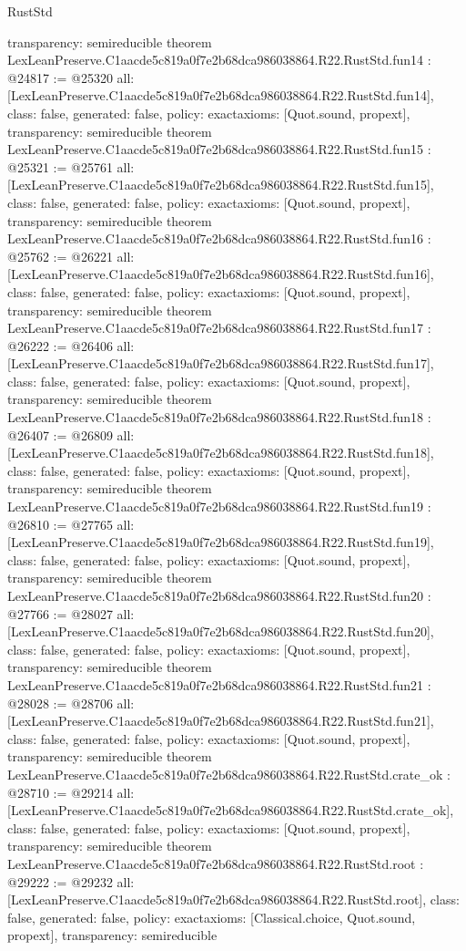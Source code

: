 \begin{lexlean}{RustStd}
\begin{coremodule}
{  transparency: semireducible
}
theorem LexLeanPreserve.C1aacde5c819a0f7e2b68dca986038864.R22.RustStd.fun14 : @24817 := @25320 {
  all: [LexLeanPreserve.C1aacde5c819a0f7e2b68dca986038864.R22.RustStd.fun14],
  class: false,
  generated: false,
  policy: exact{axioms: [Quot.sound, propext]},
  transparency: semireducible
}
theorem LexLeanPreserve.C1aacde5c819a0f7e2b68dca986038864.R22.RustStd.fun15 : @25321 := @25761 {
  all: [LexLeanPreserve.C1aacde5c819a0f7e2b68dca986038864.R22.RustStd.fun15],
  class: false,
  generated: false,
  policy: exact{axioms: [Quot.sound, propext]},
  transparency: semireducible
}
theorem LexLeanPreserve.C1aacde5c819a0f7e2b68dca986038864.R22.RustStd.fun16 : @25762 := @26221 {
  all: [LexLeanPreserve.C1aacde5c819a0f7e2b68dca986038864.R22.RustStd.fun16],
  class: false,
  generated: false,
  policy: exact{axioms: [Quot.sound, propext]},
  transparency: semireducible
}
theorem LexLeanPreserve.C1aacde5c819a0f7e2b68dca986038864.R22.RustStd.fun17 : @26222 := @26406 {
  all: [LexLeanPreserve.C1aacde5c819a0f7e2b68dca986038864.R22.RustStd.fun17],
  class: false,
  generated: false,
  policy: exact{axioms: [Quot.sound, propext]},
  transparency: semireducible
}
theorem LexLeanPreserve.C1aacde5c819a0f7e2b68dca986038864.R22.RustStd.fun18 : @26407 := @26809 {
  all: [LexLeanPreserve.C1aacde5c819a0f7e2b68dca986038864.R22.RustStd.fun18],
  class: false,
  generated: false,
  policy: exact{axioms: [Quot.sound, propext]},
  transparency: semireducible
}
theorem LexLeanPreserve.C1aacde5c819a0f7e2b68dca986038864.R22.RustStd.fun19 : @26810 := @27765 {
  all: [LexLeanPreserve.C1aacde5c819a0f7e2b68dca986038864.R22.RustStd.fun19],
  class: false,
  generated: false,
  policy: exact{axioms: [Quot.sound, propext]},
  transparency: semireducible
}
theorem LexLeanPreserve.C1aacde5c819a0f7e2b68dca986038864.R22.RustStd.fun20 : @27766 := @28027 {
  all: [LexLeanPreserve.C1aacde5c819a0f7e2b68dca986038864.R22.RustStd.fun20],
  class: false,
  generated: false,
  policy: exact{axioms: [Quot.sound, propext]},
  transparency: semireducible
}
theorem LexLeanPreserve.C1aacde5c819a0f7e2b68dca986038864.R22.RustStd.fun21 : @28028 := @28706 {
  all: [LexLeanPreserve.C1aacde5c819a0f7e2b68dca986038864.R22.RustStd.fun21],
  class: false,
  generated: false,
  policy: exact{axioms: [Quot.sound, propext]},
  transparency: semireducible
}
theorem LexLeanPreserve.C1aacde5c819a0f7e2b68dca986038864.R22.RustStd.crate_ok : @28710 := @29214 {
  all: [LexLeanPreserve.C1aacde5c819a0f7e2b68dca986038864.R22.RustStd.crate_ok],
  class: false,
  generated: false,
  policy: exact{axioms: [Quot.sound, propext]},
  transparency: semireducible
}
theorem LexLeanPreserve.C1aacde5c819a0f7e2b68dca986038864.R22.RustStd.root : @29222 := @29232 {
  all: [LexLeanPreserve.C1aacde5c819a0f7e2b68dca986038864.R22.RustStd.root],
  class: false,
  generated: false,
  policy: exact{axioms: [Classical.choice, Quot.sound, propext]},
  transparency: semireducible
}


\end{coremodule}
\end{lexlean}
